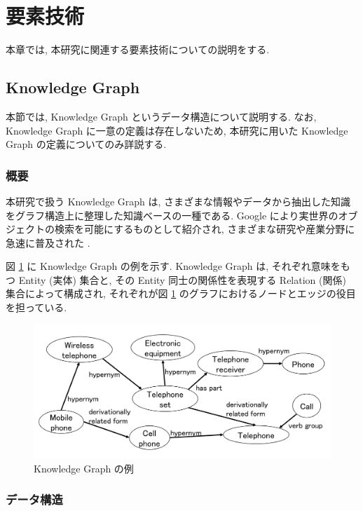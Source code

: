 \newpage
\changeindent{0cm}
\section{要素技術}
\changeindent{2cm}

本章では, 本研究に関連する要素技術についての説明をする.

\subsection{Knowledge Graph}

本節では, Knowledge Graph というデータ構造について説明する. なお, Knowledge Graph に一意の定義は存在しないため, 本研究に用いた Knowledge Graph の定義についてのみ詳説する. \par

\subsubsection{概要}

本研究で扱う Knowledge Graph は, さまざまな情報やデータから抽出した知識をグラフ構造上に整理した知識ベースの一種である. Google により実世界のオブジェクトの検索を可能にするものとして紹介され, さまざまな研究や産業分野に急速に普及された \cite{google_knowledge_graph}. \par
図 \ref{kg} に Knowledge Graph の例を示す. Knowledge Graph は, それぞれ意味をもつ Entity (実体) 集合と, その Entity 同士の関係性を表現する Relation (関係) 集合によって構成され, それぞれが図 \ref{kg} のグラフにおけるノードとエッジの役目を担っている. \par

\begin{figure}[h]
    \centering
    \includegraphics[width=16cm]{assets/Ex_KG.png}
    \caption{Knowledge Graph の例}
    \label{kg}
\end{figure}

\subsubsection{データ構造}


